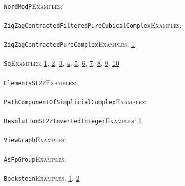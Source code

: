 \documentclass[a4paper,11pt]{report}
\begin{document}
{{ \\
 \texttt{WordModP}{\nobreakspace}{\nobreakspace}{\nobreakspace}{\nobreakspace}\textsc{Examples:} \\
 \\
 \texttt{ZigZagContractedFilteredPureCubicalComplex}{\nobreakspace}{\nobreakspace}{\nobreakspace}{\nobreakspace}\textsc{Examples:} \\
 \\
 \texttt{ZigZagContractedPureComplex}{\nobreakspace}{\nobreakspace}{\nobreakspace}{\nobreakspace}\textsc{Examples:} \href{../www/SideLinks/About/aboutPeripheral.html} {1}{\nobreakspace} \\
 \\
 \texttt{Sq}{\nobreakspace}{\nobreakspace}{\nobreakspace}{\nobreakspace}\textsc{Examples:} \href{tutorial/chap7.html} {1}{\nobreakspace}, \href{tutorial/chap10.html} {2}{\nobreakspace}, \href{../www/SideLinks/About/aboutArtinGroups.html} {3}{\nobreakspace}, \href{../www/SideLinks/About/aboutModPRings.html} {4}{\nobreakspace}, \href{../www/SideLinks/About/aboutAspherical.html} {5}{\nobreakspace}, \href{../www/SideLinks/About/aboutNonabelian.html} {6}{\nobreakspace}, \href{../www/SideLinks/About/aboutQuandles2.html} {7}{\nobreakspace}, \href{../www/SideLinks/About/aboutKnots.html} {8}{\nobreakspace}, \href{../www/SideLinks/About/aboutTensorSquare.html} {9}{\nobreakspace}, \href{../www/SideLinks/About/aboutKnotsQuandles.html} {10}{\nobreakspace} \\
 \\
 \texttt{ElementsSL2Z}{\nobreakspace}{\nobreakspace}{\nobreakspace}{\nobreakspace}\textsc{Examples:} \\
 \\
 \texttt{PathComponentOfSimplicialComplex}{\nobreakspace}{\nobreakspace}{\nobreakspace}{\nobreakspace}\textsc{Examples:} \\
 \\
 \texttt{ResolutionSL2ZInvertedInteger}{\nobreakspace}{\nobreakspace}{\nobreakspace}{\nobreakspace}\textsc{Examples:} \href{tutorial/chap10.html} {1}{\nobreakspace} \\
 \\
 \texttt{ViewGraph}{\nobreakspace}{\nobreakspace}{\nobreakspace}{\nobreakspace}\textsc{Examples:} \\
 \\
 \texttt{AsFpGroup}{\nobreakspace}{\nobreakspace}{\nobreakspace}{\nobreakspace}\textsc{Examples:} \\
 \\
 \texttt{Bockstein}{\nobreakspace}{\nobreakspace}{\nobreakspace}{\nobreakspace}\textsc{Examples:} \href{tutorial/chap7.html} {1}{\nobreakspace}, \href{../www/SideLinks/About/aboutModPRings.html} {2}{\nobreakspace} \\
}}
\end{document}
